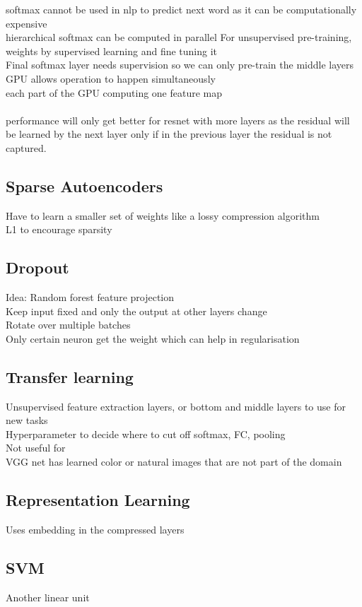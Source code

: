 \documentclass[11pt]{article}
\begin{document}
softmax cannot be used in nlp to predict next word as it can be computationally expensive
\\
hierarchical softmax can be computed in parallel
For unsupervised pre-training, weights by supervised learning and fine tuning it
\\
Final softmax layer needs supervision so we can only pre-train the middle layers
\\
GPU allows operation to happen simultaneously\\
each part of the GPU computing one feature map
\\
\\
performance will only get better for resnet with more layers as the residual will be learned by the next layer only if in the previous layer the residual is not captured.
\subsection*{Sparse Autoencoders}
Have to learn a smaller set of weights like a lossy compression algorithm \\
L1 to encourage sparsity
\subsection*{Dropout}
Idea: Random forest feature projection\\
Keep input fixed and only the output at other layers change\\
Rotate over multiple batches\\
Only certain neuron get the weight which can help in regularisation
\subsection*{Transfer learning}
Unsupervised feature extraction layers, or bottom and middle layers to use for new tasks\\
Hyperparameter to decide where to cut off softmax, FC, pooling
\\
Not useful for\\
VGG net has learned color or natural images that are not part of the domain
\subsection*{Representation Learning}
Uses embedding in the compressed layers
\subsection*{SVM}
Another linear unit
\newpage\noindent
\end{document}
